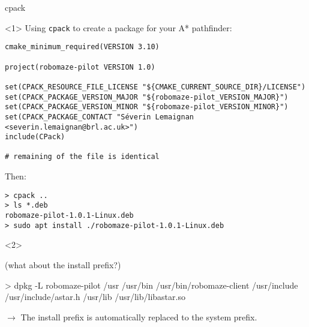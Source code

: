 \documentclass[compress]{beamer}
\begin{document}
\begin{frame}[fragile]{cpack}
\begin{onlyenv}<1>
    Using \texttt{cpack} to create a package for your A* pathfinder:

\begin{verbatim}
cmake_minimum_required(VERSION 3.10)

project(robomaze-pilot VERSION 1.0)

set(CPACK_RESOURCE_FILE_LICENSE "${CMAKE_CURRENT_SOURCE_DIR}/LICENSE")
set(CPACK_PACKAGE_VERSION_MAJOR "${robomaze-pilot_VERSION_MAJOR}")
set(CPACK_PACKAGE_VERSION_MINOR "${robomaze-pilot_VERSION_MINOR}")
set(CPACK_PACKAGE_CONTACT "Séverin Lemaignan <severin.lemaignan@brl.ac.uk>")
include(CPack)

# remaining of the file is identical
\end{verbatim}

Then:

\begin{verbatim}
> cpack ..
> ls *.deb
robomaze-pilot-1.0.1-Linux.deb
> sudo apt install ./robomaze-pilot-1.0.1-Linux.deb
\end{verbatim}
    \end{onlyenv}
    \begin{onlyenv}<2>

        (what about the install prefix?)

\begin{shcode}
> dpkg -L robomaze-pilot
/usr
/usr/bin
/usr/bin/robomaze-client
/usr/include
/usr/include/astar.h
/usr/lib
/usr/lib/libastar.so
\end{shcode}

$\rightarrow$ The install prefix is automatically replaced to the system prefix.
    \end{onlyenv}

\end{frame}
\end{document}
